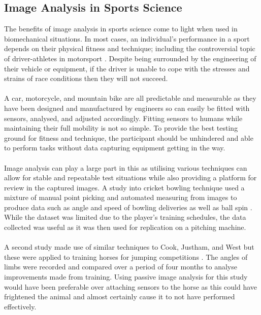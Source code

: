 \newcommand{\ignore}[1]{}
\subsection{Image Analysis in Sports Science}
	The benefits of image analysis in sports science come to light when used in biomechanical situations. In most cases, an individual's performance in a sport depends on their physical fitness and technique; including the controversial topic of driver-athletes in motorsport \ignore{Cite something}. Despite being surrounded by the engineering of their vehicle or equipment, if the driver is unable to cope with the stresses and strains of race conditions then they will not succeed. 
	\\\\
	A car, motorcycle, and mountain bike are all predictable and measurable as they have been designed and manufactured by engineers so can easily be fitted with sensors, analysed, and adjusted accordingly\ignore{Cite}. Fitting sensors to humans while maintaining their full mobility is not so simple. To provide the best testing ground for fitness and technique, the participant should be unhindered and able to perform tasks without data capturing equipment getting in the way.
	\\\\
	Image analysis can play a large part in this as utilising various techniques can allow for stable and repeatable test situations while also providing a platform for review in the captured images. A study into cricket bowling technique used a mixture of manual point picking and automated measuring from images to produce data such as angle and speed of bowling deliveries as well as ball spin \citep{cricketimaging}. While the dataset was limited due to the player's training schedules, the data collected was useful as it was then used for replication on a pitching machine.
	\\\\
	A second study made use of similar techniques to Cook, Justham, and West but these were applied to training horses for jumping competitions \citep{jumpyhorses}. The angles of limbs were recorded and compared over a period of four months to analyse improvements made from training. Using passive image analysis for this study would have been preferable over attaching sensors to the horse as this could have frightened the animal and almost certainly cause it to not have performed effectively.